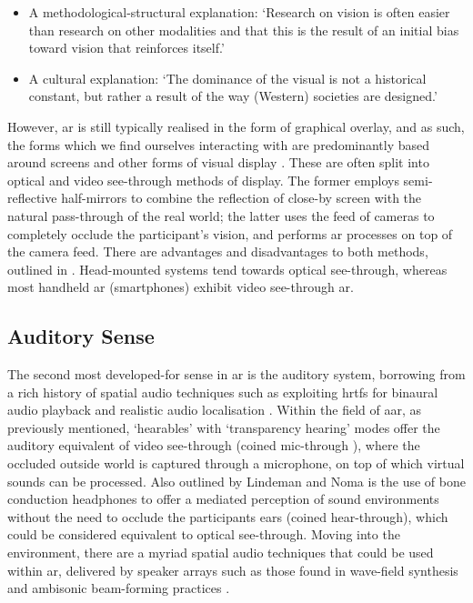 \begin{itemize}
    \item A methodological-structural explanation: `Research on vision is often easier than research on other modalities and that this is the result of an initial bias toward vision that reinforces itself.'
    \item A cultural explanation: `The dominance of the visual is not a historical constant, but rather a result of the way (Western) societies are designed.'
\end{itemize}

However, \gls{ar} is still typically realised in the form of graphical overlay, and as such, the forms which we find ourselves interacting with are predominantly based around screens and other forms of visual display \citep{dey2018}. These are often split into optical and video see-through methods of display. The former employs semi-reflective half-mirrors to combine the reflection of close-by screen with the natural pass-through of the real world; the latter uses the feed of cameras to completely occlude the participant's vision, and performs \gls{ar} processes on top of the camera feed. There are advantages and disadvantages to both methods, outlined in \citep{rolland2000}. Head-mounted systems tend towards optical see-through, whereas most handheld \gls{ar} (smartphones) exhibit video see-through \gls{ar}.

\subsection{Auditory Sense}\label{sec: ar-sensory-auditory}
The second most developed-for sense in \gls{ar} is the auditory system, borrowing from a rich history of spatial audio techniques such as exploiting \glspl{hrtf} for binaural audio playback and realistic audio localisation \citep{blauert1969,blauert1996}. Within the field of \gls{aar}, as previously mentioned, `hearables' with `transparency hearing' modes offer the auditory equivalent of video see-through (coined mic-through \citep{lindeman2008}), where the occluded outside world is captured through a microphone, on top of which virtual sounds can be processed. Also outlined by Lindeman and Noma is the use of bone conduction headphones to offer a mediated perception of sound environments without the need to occlude the participants ears (coined hear-through), which could be considered equivalent to optical see-through. Moving into the environment, there are a myriad spatial audio techniques that could be used within \gls{ar}, delivered by speaker arrays such as those found in wave-field synthesis \citep{berkhout1993} and ambisonic beam-forming practices \citep{sharma2018,mcarthur2019}.


